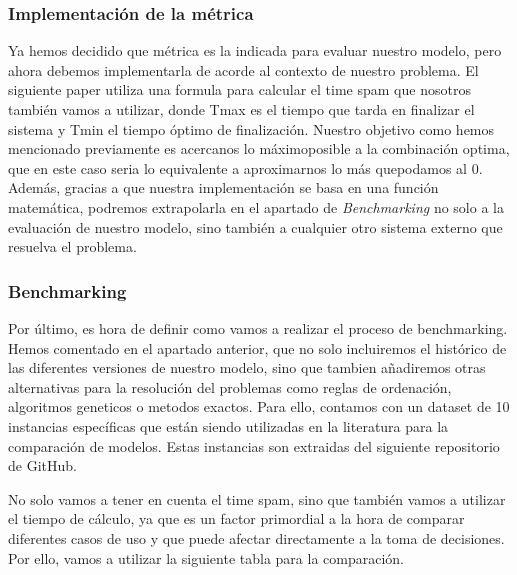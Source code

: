 \subsubsection{Implementación de la métrica}
Ya hemos decidido que métrica es la indicada para evaluar nuestro modelo, pero ahora debemos
implementarla de acorde al contexto de nuestro problema. El siguiente paper utiliza una formula para
calcular el time spam que nosotros también vamos a utilizar, donde Tmax es el tiempo que tarda en
finalizar el sistema y Tmin el tiempo óptimo de finalización. Nuestro objetivo como hemos mencionado
previamente es acercanos lo máximoposible a la combinación optima, que en este caso seria lo equivalente a
aproximarnos lo más quepodamos al 0. Además, gracias a que nuestra implementación se basa en una función
matemática, podremos extrapolarla en el apartado de \textit{Benchmarking} no solo a la evaluación de nuestro
modelo, sino también a cualquier otro sistema externo que resuelva el problema.


\subsubsection{Benchmarking}
Por último, es hora de definir como vamos a realizar el proceso de benchmarking. Hemos comentado en
el apartado anterior, que no solo incluiremos el histórico de las diferentes versiones de nuestro
modelo, sino que tambien añadiremos otras alternativas para la resolución del problemas como reglas de
ordenación, algoritmos geneticos o metodos exactos. Para ello, contamos con un dataset de 10 instancias
específicas que están siendo utilizadas en la literatura para la comparación de modelos. Estas instancias
son extraidas del siguiente repositorio \cite*{ptal} de GitHub.\medskip

No solo vamos a tener en cuenta el time spam, sino que también vamos a utilizar el tiempo de cálculo,
ya que es un factor primordial a la hora de comparar diferentes casos de uso y que puede afectar
directamente a la toma de decisiones. Por ello, vamos a utilizar la siguiente tabla para la comparación.
\medskip


